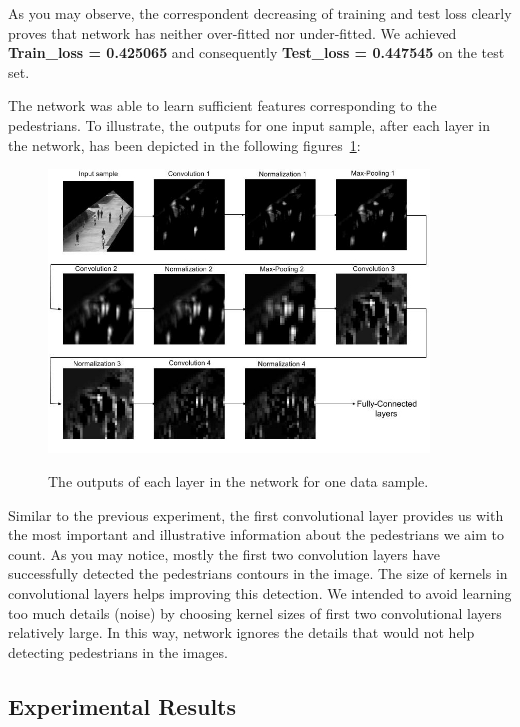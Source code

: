 As you may observe, the correspondent decreasing of training and test loss clearly proves that network has neither over-fitted nor under-fitted. We achieved \textbf{Train\_loss = 0.425065} and consequently \textbf{Test\_loss = 0.447545} on the test set.

\noindent The network was able to learn sufficient features corresponding to the pedestrians. To illustrate, the outputs for one input sample, after each layer in the network, has been depicted in the following figures~\ref{fig:feats}: 



\begin{figure}[H]
	\centering
	{\includegraphics[width=0.9\textwidth]{images/ped_convs}}
	\caption{The outputs of each layer in the network for one data sample. }
	\label{fig:feats}
\end{figure}



Similar to the previous experiment, the first convolutional layer provides us with the most important and illustrative information about the pedestrians we aim to count. As you may notice, mostly the first two convolution layers have successfully detected the pedestrians contours in the image. The size of kernels in convolutional layers helps improving this detection. We intended to avoid learning too much details (noise) by choosing kernel sizes of first two convolutional layers relatively large. In this way, network ignores the details that would not help detecting pedestrians in the images. 

\subsection{Experimental Results}

